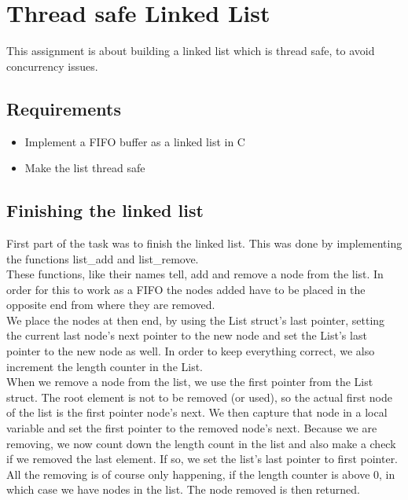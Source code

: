 \chapter{Thread safe Linked List}
This assignment is about building a linked list which is thread safe, to avoid concurrency issues.

\section{Requirements}
\begin{itemize}
\item Implement a FIFO buffer as a linked list in C
\item Make the list thread safe
\end{itemize}

\section{Finishing the linked list}
First part of the task was to finish the linked list. This was done by implementing the functions list\_add and list\_remove.\\

These functions, like their names tell, add and remove a node from the list. In order for this to work as a FIFO the nodes added have to be placed in the opposite end from where they are removed.\\

We place the nodes at then end, by using the List struct's last pointer, setting the current last node's next pointer to the new node and set the List's last pointer to the new node as well. In order to keep everything correct, we also increment the length counter in the List.\\

When we remove a node from the list, we use the first pointer from the List struct. The root element is not to be removed (or used), so the actual first node of the list is the first pointer node's next. We then capture that node in a local variable and set the first pointer to the removed node's next. Because we are removing, we now count down the length count in the list and also make a check if we removed the last element. If so, we set the list's last pointer to first pointer.\\

All the removing is of course only happening, if the length counter is above 0, in which case we have nodes in the list. The node removed is then returned.

